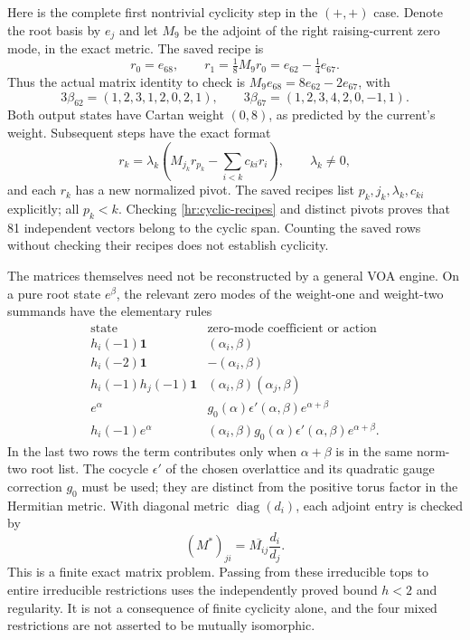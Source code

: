 Here is the complete first nontrivial cyclicity step in the $(+,+)$
case. Denote the root basis by $e_j$ and let $M_9$ be the adjoint
of the right raising-current zero mode, in the exact metric.
The saved recipe is
\[
 r_0=e_{68},\qquad
 r_1=\tfrac18M_9r_0=e_{62}-\tfrac14e_{67}.
\]
Thus the actual matrix identity to check is
$M_9e_{68}=8e_{62}-2e_{67}$, with
\[
 3\beta_{62}=(1,2,3,1,2,0,2,1),\qquad
 3\beta_{67}=(1,2,3,4,2,0,-1,1).
\]
Both output states have Cartan weight $(0,8)$, as predicted by
the current's weight. Subsequent steps have the exact format
\begin{equation}
 r_k=\lambda_k\left(M_{j_k}r_{p_k}
                   -\sum_{i<k}c_{ki}r_i\right),
 \qquad \lambda_k\ne0,
 \label{hr:cyclic-recipes}
\end{equation}
and each $r_k$ has a new normalized pivot. The saved recipes list
$p_k,j_k,\lambda_k,c_{ki}$ explicitly; all $p_k<k$. Checking
\eqref{hr:cyclic-recipes} and distinct pivots proves that 81
independent vectors belong to the cyclic span. Counting the saved
rows without checking their recipes does not establish cyclicity.

The matrices themselves need not be reconstructed by a general VOA
engine. On a pure root state $e^\beta$, the relevant zero modes of
the weight-one and weight-two summands have the elementary rules
\[
 \begin{array}{c|c}
 \text{state}&\text{zero-mode coefficient or action}\\\hline
 h_i(-1)\mathbf1&(\alpha_i,\beta)\\
 h_i(-2)\mathbf1&-(\alpha_i,\beta)\\
 h_i(-1)h_j(-1)\mathbf1&(\alpha_i,\beta)(\alpha_j,\beta)\\
 e^\alpha&g_0(\alpha)\epsilon'(\alpha,\beta)e^{\alpha+\beta}\\
 h_i(-1)e^\alpha&(\alpha_i,\beta)g_0(\alpha)
                          \epsilon'(\alpha,\beta)e^{\alpha+\beta}.
 \end{array}
\]
In the last two rows the term contributes only when
$\alpha+\beta$ is in the same norm-two root list.
The cocycle $\epsilon'$ of the chosen overlattice and its quadratic
gauge correction $g_0$ must be used; they are distinct from the
positive torus factor in the Hermitian metric. With diagonal metric
$\operatorname{diag}(d_i)$, each adjoint entry is checked by
\[
 (M^*)_{ji}=\overline{M_{ij}}\frac{d_i}{d_j}.
\]
This is a finite exact matrix problem. Passing from these irreducible
tops to entire irreducible restrictions uses the independently
proved bound $h<2$ and regularity. It is not a consequence of
finite cyclicity alone, and the four mixed restrictions are not
asserted to be mutually isomorphic.

